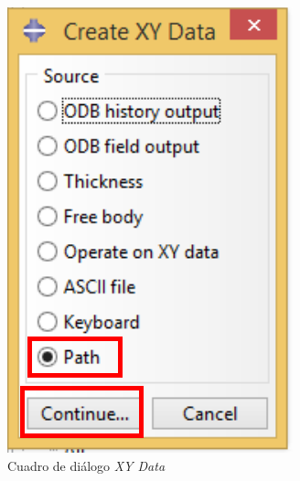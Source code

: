 \begin{itemize}
\begin{figure}[!h]
\begin{subfigure}[!h]{0.35\textwidth}
      \includegraphics[width=\textwidth]{./body/images/post12.pdf}
      \caption{Cuadro de diálogo \textit{XY Data}}
      \label{post12}
    \end{subfigure}%
    \begin{subfigure}[!h]{0.44\textwidth}

\end{subfigure}
\end{figure}
\end{itemize}
